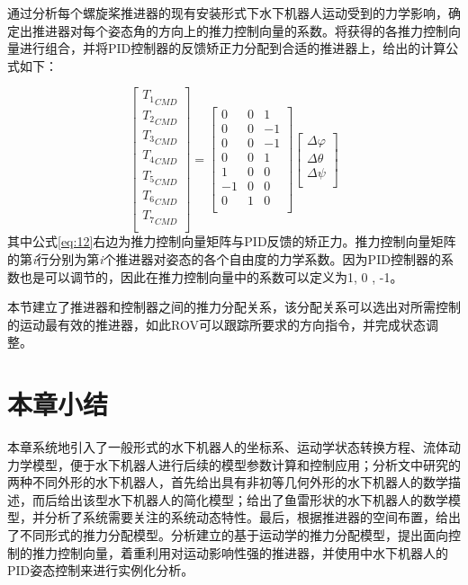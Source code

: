 通过分析每个螺旋桨推进器的现有安装形式下水下机器人运动受到的力学影响，确定出推进器对每个姿态角的方向上的推力控制向量的系数。将获得的各推力控制向量进行组合，并将PID控制器的反馈矫正力分配到合适的推进器上，给出的计算公式如下：

\begin{equation}
\label{eq:12}
\left[ {\begin{array}{*{20}{c}}
   {{T_1}_{CMD}}  \\
   {{T_2}_{CMD}}  \\
   {{T_3}_{CMD}}  \\
   {{T_4}_{CMD}}  \\
   {{T_5}_{CMD}}  \\
   {{T_6}_{CMD}}  \\
   {{T_7}_{CMD}}  \\
\end{array}} \right] = \left[ {\begin{array}{*{20}{c}}
   0 & 0 & 1  \\
   0 & 0 & { - 1}  \\
   0 & 0 & { - 1}  \\
   0 & 0 & 1  \\
   1 & 0 & 0  \\
   { - 1} & 0 & 0  \\
   0 & 1 & 0  \\
\end{array}} \right]\left[ {\begin{array}{*{20}{c}}
   {\Delta \varphi }  \\
   {\Delta \theta }  \\
   {\Delta \psi }  \\
\end{array}} \right]
\end{equation}
其中公式\ref{eq:12}右边为推力控制向量矩阵与PID反馈的矫正力。推力控制向量矩阵的第\textit{i}行分别为第\textit{i}个推进器对姿态的各个自由度的力学系数。因为PID控制器的系数也是可以调节的，因此在推力控制向量中的系数可以定义为1, 0 , -1。

本节建立了推进器和控制器之间的推力分配关系，该分配关系可以选出对所需控制的运动最有效的推进器，如此ROV可以跟踪所要求的方向指令，并完成状态调整。

\section{本章小结 }

本章系统地引入了一般形式的水下机器人的坐标系、运动学状态转换方程、流体动力学模型，便于水下机器人进行后续的模型参数计算和控制应用；分析文中研究的两种不同外形的水下机器人，首先给出具有非初等几何外形的水下机器人的数学描述，而后给出该型水下机器人的简化模型；给出了鱼雷形状的水下机器人的数学模型，并分析了系统需要关注的系统动态特性。最后，根据推进器的空间布置，给出了不同形式的推力分配模型。分析建立的基于运动学的推力分配模型，提出面向控制的推力控制向量，着重利用对运动影响性强的推进器，并使用中水下机器人的PID姿态控制来进行实例化分析。

